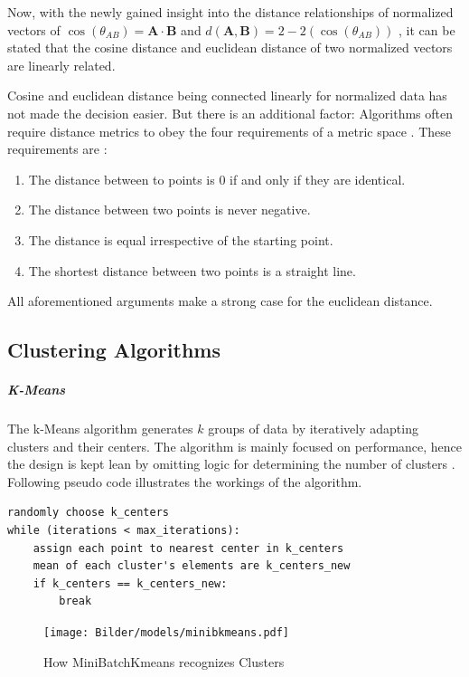 		Now, with the newly gained insight into the distance relationships of normalized vectors of $\cos(\theta_{AB}) = \mathbf{A} \cdot \mathbf{B}$ and $d(\mathbf{A}, \mathbf{B}) = 2 - 2(\cos(\theta_{AB}))$ , it can be stated that the cosine distance and euclidean distance of two normalized vectors are linearly related.
				
		Cosine and euclidean distance being connected linearly for normalized data has not made the decision easier. But there is an additional factor: 
		Algorithms often require distance metrics to obey the four requirements of a metric space \cite{schubertTriangleInequalityCosine2021}.
		These requirements are \cite{rajaramanNeighborSearchHigh}:
		\begin{enumerate}
			\item The distance between to points is 0 if and only if they are identical.
			\item The distance between two points is never negative.
			\item The distance is equal irrespective of the starting point.
			\item The shortest distance between two points is a straight line.
		\end{enumerate} 
		
		All aforementioned arguments make a strong case for the euclidean distance.
		
\subsection{Clustering Algorithms}
		
		\subparagraph{K-Means}
		The k-Means algorithm generates $k$ groups of data by iteratively adapting clusters and their centers. The algorithm is mainly focused on performance, hence the design is kept lean by omitting logic for determining the number of clusters \cite[c.6.2]{40algorithms}. Following pseudo code illustrates the workings of the algorithm.
		
		\begin{lstlisting}
randomly choose k_centers
while (iterations < max_iterations):
	assign each point to nearest center in k_centers
	mean of each cluster's elements are k_centers_new
	if k_centers == k_centers_new:
		break
		\end{lstlisting}
	
			 \begin{figure}[!h]
		\centering
		\texttt{[image: Bilder/models/minibkmeans.pdf]}
		\caption{How MiniBatchKmeans recognizes Clusters \cite{sklearn}}
		\label{fig:kmeans-viz}
		\end{figure}
	
